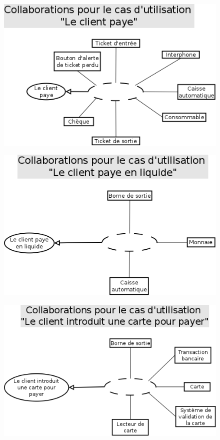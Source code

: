 \documentclass[a4paper]{article}
\begin{document}
\begin{figure}[!ht]
\centering
\includegraphics[scale=.5]{collaborations/_paye.png}
\end{figure}
\begin{figure}[!ht]
\centering
\includegraphics[scale=.5]{collaborations/_liquide.png}
\end{figure}
\begin{figure}[!ht]
\centering
\includegraphics[scale=.5]{collaborations/_carte.png}
\end{figure}
\end{document}

